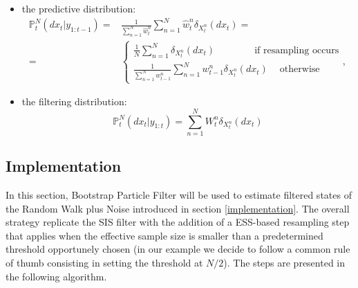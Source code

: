 \documentclass[
]{book}
\theoremstyle{break}
\theoremstyle{nonumberplain}
\begin{document}
\begin{itemize}
    \item the predictive distribution:
    \begin{equation}
    \begin{split}
        \mathbb P_t^N (dx_t|y_{1:t-1})=&\frac{1}{\sum_{n=1}^N\hat w_t^n}\sum_{n=1}^N\hat w_t^n\delta_{X_t^n}(dx_t)=\\
        =&\begin{cases}
        \frac{1}{N}\sum_{n=1}^N\delta_{X_t^n}(dx_t)
        ~~~~~~~~~~~~~~~~ ~\text{ if resampling occurs}\\
        \frac{1}{\sum_{n=1}^N w_{t-1}^n}\sum_{n=1}^Nw_{t-1}^n\delta_{X_t^n}(dx_t)~~~~ \text{ otherwise}
        \end{cases},
        \end{split}
    \end{equation}
    \item the filtering distribution:
    \begin{equation}
        \mathbb P_t^N (dx_t|y_{1:t})=\sum_{n=1}^NW_t^n\delta_{X_t^n}(dx_t)
    \end{equation}
\end{itemize}

\subsection{Implementation}

In this section, Bootstrap Particle Filter will be used to estimate
filtered states of the Random Walk plus Noise introduced in section
\ref{implementation}. The overall strategy replicate the SIS filter with
the addition of a ESS-based resampling step that applies when the
effective sample size is smaller than a predetermined threshold
opportunely chosen (in our example we decide to follow a common rule of
thumb consisting in setting the threshold at \(N/2\)). The steps are
presented in the following algorithm.
\end{document}
